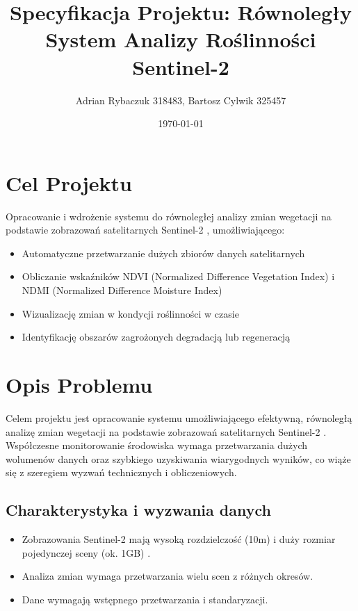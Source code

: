 \documentclass[12pt,a4paper]{article}
\title{Specyfikacja Projektu: Równoległy System Analizy Roślinności Sentinel-2}
\author{Adrian Rybaczuk 318483, Bartosz Cylwik 325457}
\date{\today}
\begin{document}
\maketitle

\tableofcontents
\newpage

\section{Cel Projektu}
\label{sec:goal}
Opracowanie i wdrożenie systemu do równoległej analizy zmian wegetacji na podstawie zobrazowań satelitarnych Sentinel-2 \cite{esa_sentinel2}, umożliwiającego:
\begin{itemize}[leftmargin=*]
    \item Automatyczne przetwarzanie dużych zbiorów danych satelitarnych \cite{copernicus_hub}
    \item Obliczanie wskaźników NDVI (Normalized Difference Vegetation Index) i NDMI (Normalized Difference Moisture Index) \cite{usgs_ndvi, nasa_ndvi}
    \item Wizualizację zmian w kondycji roślinności w czasie
    \item Identyfikację obszarów zagrożonych degradacją lub regeneracją
\end{itemize}

\section{Opis Problemu}
\label{sec:problem}

Celem projektu jest opracowanie systemu umożliwiającego efektywną, równoległą analizę zmian wegetacji na podstawie zobrazowań satelitarnych Sentinel-2 \cite{esa_sentinel2}. Współczesne monitorowanie środowiska wymaga przetwarzania dużych wolumenów danych oraz szybkiego uzyskiwania wiarygodnych wyników, co wiąże się z szeregiem wyzwań technicznych i obliczeniowych.

\subsection{Charakterystyka i wyzwania danych}
\begin{itemize}[leftmargin=*]
    \item Zobrazowania Sentinel-2 mają wysoką rozdzielczość (10m) i duży rozmiar pojedynczej sceny (ok. 1GB) \cite{copernicus_hub}.
    \item Analiza zmian wymaga przetwarzania wielu scen z różnych okresów.
    \item Dane wymagają wstępnego przetwarzania i standaryzacji.
\end{itemize}
\end{document}
